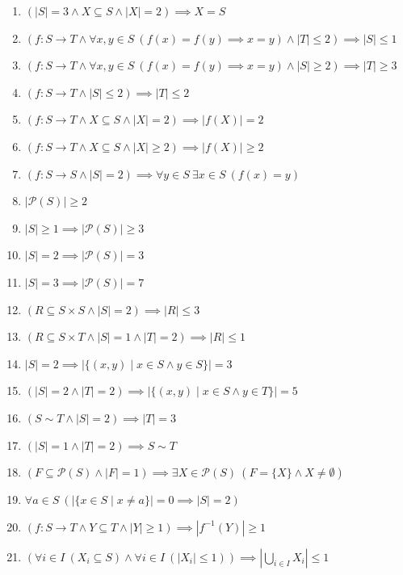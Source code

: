 \documentclass[11pt,a4paper]{article}
\begin{document}
\begin{enumerate}
\item $\displaystyle (|S| = 3 \land X \subseteq S \land |X| = 2) \implies X = S$
\item $\displaystyle (f \colon S \to T \land \forall x, y \in S\ (f(x) = f(y) \implies x = y) \land |T| \le 2) \implies |S| \le 1$
\item $\displaystyle (f \colon S \to T \land \forall x, y \in S\ (f(x) = f(y) \implies x = y) \land |S| \ge 2) \implies |T| \ge 3$
\item $\displaystyle (f \colon S \to T \land |S| \le 2) \implies |T| \le 2$
\item $\displaystyle (f \colon S \to T \land X \subseteq S \land |X| = 2) \implies |f(X)| = 2$
\item $\displaystyle (f \colon S \to T \land X \subseteq S \land |X| \ge 2) \implies |f(X)| \ge 2$
\item $\displaystyle (f \colon S \to S \land |S| = 2) \implies \forall y \in S\ \exists x \in S\ (f(x) = y)$
\item $\displaystyle |\mathcal{P}(S)| \ge 2$
\item $\displaystyle |S| \ge 1 \implies |\mathcal{P}(S)| \ge 3$
\item $\displaystyle |S| = 2 \implies |\mathcal{P}(S)| = 3$
\item $\displaystyle |S| = 3 \implies |\mathcal{P}(S)| = 7$
\item $\displaystyle (R \subseteq S \times S \land |S| = 2) \implies |R| \le 3$
\item $\displaystyle (R \subseteq S \times T \land |S| = 1 \land |T| = 2) \implies |R| \le 1$
\item $\displaystyle |S| = 2 \implies |\{(x, y) \mid x \in S \land y \in S\}| = 3$
\item $\displaystyle (|S| = 2 \land |T| = 2) \implies |\{(x, y) \mid x \in S \land y \in T\}| = 5$
\item $\displaystyle (S \sim T \land |S| = 2) \implies |T| = 3$
\item $\displaystyle (|S| = 1 \land |T| = 2) \implies S \sim T$
\item $\displaystyle (F \subseteq \mathcal{P}(S) \land |F| = 1) \implies \exists X \in \mathcal{P}(S)\ (F = \{X\} \land X \neq \emptyset)$
\item $\displaystyle \forall a \in S\ (|\{x \in S \mid x \neq a\}| = 0 \implies |S| = 2)$
\item $\displaystyle (f \colon S \to T \land Y \subseteq T \land |Y| \ge 1) \implies |f^{-1}(Y)| \ge 1$
\item $\displaystyle (\forall i \in I\ (X_{i} \subseteq S) \land \forall i \in I\ (|X_{i}| \le 1)) \implies |\bigcup_{i \in I} X_{i}| \le 1$

\end{enumerate}
\end{document}
